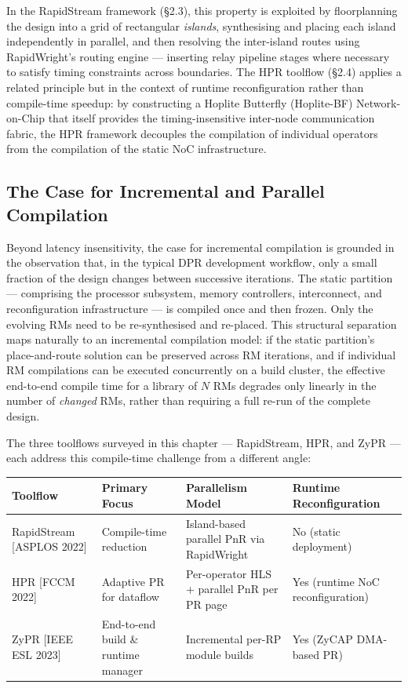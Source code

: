 In the RapidStream framework (§2.3), this property is exploited by floorplanning the design into a grid of rectangular \textit{islands}, synthesising and placing each island independently in parallel, and then resolving the inter-island routes using RapidWright's routing engine — inserting relay pipeline stages where necessary to satisfy timing constraints across boundaries. The HPR toolflow (§2.4) applies a related principle but in the context of runtime reconfiguration rather than compile-time speedup: by constructing a Hoplite Butterfly (Hoplite-BF) Network-on-Chip that itself provides the timing-insensitive inter-node communication fabric, the HPR framework decouples the compilation of individual operators from the compilation of the static NoC infrastructure.

\subsection{The Case for Incremental and Parallel Compilation}

Beyond latency insensitivity, the case for incremental compilation is grounded in the observation that, in the typical DPR development workflow, only a small fraction of the design changes between successive iterations. The static partition — comprising the processor subsystem, memory controllers, interconnect, and reconfiguration infrastructure — is compiled once and then frozen. Only the evolving RMs need to be re-synthesised and re-placed. This structural separation maps naturally to an incremental compilation model: if the static partition's place-and-route solution can be preserved across RM iterations, and if individual RM compilations can be executed concurrently on a build cluster, the effective end-to-end compile time for a library of $N$ RMs degrades only linearly in the number of \textit{changed} RMs, rather than requiring a full re-run of the complete design.

The three toolflows surveyed in this chapter — RapidStream, HPR, and ZyPR — each address this compile-time challenge from a different angle:

\begin{table}[htbp]
\centering
\begin{tabular}{llll}
\toprule
Toolflow & Primary Focus & Parallelism Model & Runtime Reconfiguration \\
\midrule
RapidStream [ASPLOS 2022] & Compile-time reduction & Island-based parallel PnR via RapidWright & No (static deployment) \\
HPR [FCCM 2022] & Adaptive PR for dataflow & Per-operator HLS + parallel PnR per PR page & Yes (runtime NoC reconfiguration) \\
ZyPR [IEEE ESL 2023] & End-to-end build \& runtime manager & Incremental per-RP module builds & Yes (ZyCAP DMA-based PR) \\
\bottomrule
\end{tabular}
\end{table}

